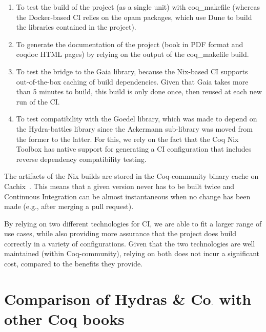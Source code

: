 \documentclass{easychair}
\newcommand{\community}{Coq-community\xspace}
\newcommand{\Hydras}{Hydras \& Co$\text.$\xspace}
\begin{document}
\begin{enumerate}
\item To test the build of the project (as a single unit) with coq\_makefile (whereas the Docker-based CI relies on the opam packages, which use Dune to build the libraries contained in the project).

\item To generate the documentation of the project (book in PDF format and coqdoc HTML pages) by relying on the output of the coq\_makefile build.

\item To test the bridge to the Gaia library, because the Nix-based CI supports out-of-the-box caching of build dependencies.
%
Given that Gaia takes more than 5 minutes to build, this build is only done once, then reused at each new run of the CI.

\item To test compatibility with the Goedel library, which was made to depend on the Hydra-battles library since the Ackermann sub-library was moved from the former to the latter.
%
For this, we rely on the fact that the Coq Nix Toolbox has native support for generating a CI configuration that includes reverse dependency compatibility testing.
\end{enumerate}

The artifacts of the Nix builds are stored in the \community binary cache on Cachix~\cite{cachix}.
%
This means that a given version never has to be built twice and Continuous Integration can be almost instantaneous when no change has been made (e.g., after merging a pull request).

By relying on two different technologies for CI, we are able to fit a larger range of use cases, while also providing more assurance that the project does build correctly in a variety of configurations.
%
Given that the two technologies are well maintained (within \community), relying on both does not incur a significant cost, compared to the benefits they provide.

\section{Comparison of \Hydras with other Coq books}
\end{document}
